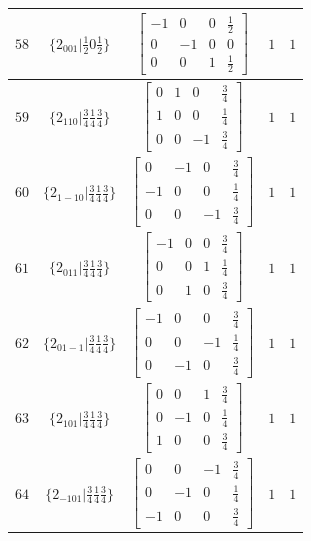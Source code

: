 \documentclass[fleqn,8pt]{jsarticle}
\begin{document}
\begin{longtable}{ccccc}
$ 58 $ & $ \{2{}_{001}|\frac{1}{2} 0 \frac{1}{2}\} $ & $ \begin{bmatrix} -1 & 0 & 0 & \frac{1}{2} \\ 0 & -1 & 0 & 0 \\ 0 & 0 & 1 & \frac{1}{2} \end{bmatrix} $ & $ 1 $ & $ 1 $ \\ \hline
$ 59 $ & $ \{2{}_{110}|\frac{3}{4} \frac{1}{4} \frac{3}{4}\} $ & $ \begin{bmatrix} 0 & 1 & 0 & \frac{3}{4} \\ 1 & 0 & 0 & \frac{1}{4} \\ 0 & 0 & -1 & \frac{3}{4} \end{bmatrix} $ & $ 1 $ & $ 1 $ \\ \hline
$ 60 $ & $ \{2{}_{1-10}|\frac{3}{4} \frac{1}{4} \frac{3}{4}\} $ & $ \begin{bmatrix} 0 & -1 & 0 & \frac{3}{4} \\ -1 & 0 & 0 & \frac{1}{4} \\ 0 & 0 & -1 & \frac{3}{4} \end{bmatrix} $ & $ 1 $ & $ 1 $ \\ \hline
$ 61 $ & $ \{2{}_{011}|\frac{3}{4} \frac{1}{4} \frac{3}{4}\} $ & $ \begin{bmatrix} -1 & 0 & 0 & \frac{3}{4} \\ 0 & 0 & 1 & \frac{1}{4} \\ 0 & 1 & 0 & \frac{3}{4} \end{bmatrix} $ & $ 1 $ & $ 1 $ \\ \hline
$ 62 $ & $ \{2{}_{01-1}|\frac{3}{4} \frac{1}{4} \frac{3}{4}\} $ & $ \begin{bmatrix} -1 & 0 & 0 & \frac{3}{4} \\ 0 & 0 & -1 & \frac{1}{4} \\ 0 & -1 & 0 & \frac{3}{4} \end{bmatrix} $ & $ 1 $ & $ 1 $ \\ \hline
$ 63 $ & $ \{2{}_{101}|\frac{3}{4} \frac{1}{4} \frac{3}{4}\} $ & $ \begin{bmatrix} 0 & 0 & 1 & \frac{3}{4} \\ 0 & -1 & 0 & \frac{1}{4} \\ 1 & 0 & 0 & \frac{3}{4} \end{bmatrix} $ & $ 1 $ & $ 1 $ \\ \hline
$ 64 $ & $ \{2{}_{-101}|\frac{3}{4} \frac{1}{4} \frac{3}{4}\} $ & $ \begin{bmatrix} 0 & 0 & -1 & \frac{3}{4} \\ 0 & -1 & 0 & \frac{1}{4} \\ -1 & 0 & 0 & \frac{3}{4} \end{bmatrix} $ & $ 1 $ & $ 1 $ \\ \hline

\end{longtable}
\end{document}
